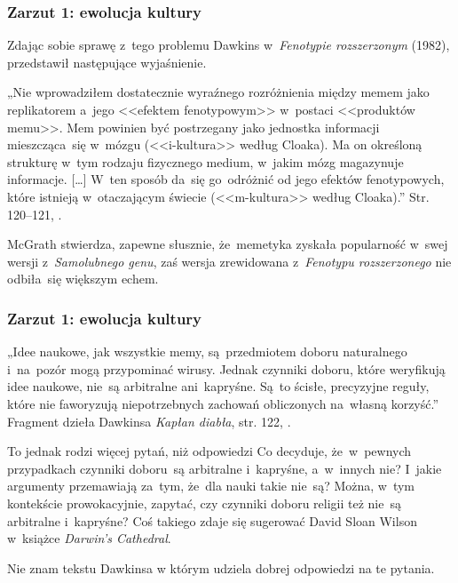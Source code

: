 \documentclass[10pt,t]{beamer}
\begin{document}
\begin{frame}
  \frametitle{Zarzut 1: ewolucja kultury}


  Zdając sobie sprawę z~tego problemu Dawkins w~\textit{Fenotypie
    rozszerzonym} (1982), przedstawił
  następujące wyjaśnienie.

  „Nie wprowadziłem dostatecznie wyraźnego rozróżnienia między memem
  jako replikatorem a~jego <<efektem fenotypowym>> w~postaci
  <<produktów memu>>. Mem powinien być postrzegany jako jednostka
  informacji mieszcząca~się w~mózgu (<<i-kultura>> według Cloaka).
  Ma on określoną strukturę w~tym rodzaju fizycznego medium, w~jakim
  mózg magazynuje informacje. [\ldots] W~ten sposób da~się go~odróżnić od
  jego efektów fenotypowych, które istnieją w~otaczającym świecie
  (<<m-kultura>> według Cloaka).” Str. 120--121,
  \cite{McGrathBogDawkinsa2008}.

  McGrath stwierdza, zapewne słusznie, że~memetyka
  zyskała popularność w~swej wersji z~\textit{Samolubnego genu}, zaś
  wersja zrewidowana z~\textit{Fenotypu rozszerzonego} nie odbiła~się
  większym echem.

\end{frame}





\begin{frame}
  \frametitle{Zarzut 1: ewolucja kultury}


  „Idee naukowe, jak wszystkie memy, są~przedmiotem doboru naturalnego
  i~na~pozór mogą przypominać wirusy. Jednak czynniki doboru, które
  weryfikują idee naukowe, nie~są arbitralne ani~kapryśne. Są~to ścisłe,
  precyzyjne reguły, które nie faworyzują niepotrzebnych zachowań
  obliczonych na~własną korzyść.” Fragment dzieła Dawkinsa
  \textit{Kapłan diabła}, str. 122, \cite{McGrathBogDawkinsa2008}.

  To jednak rodzi więcej pytań, niż odpowiedzi Co decyduje, że~w~pewnych
  przypadkach czynniki doboru~są
  arbitralne i~kapryśne, a~w~innych nie? I~jakie argumenty
  przemawiają za~tym, że~dla nauki takie nie~są? Można, w~tym
  kontekście prowokacyjnie, zapytać, czy czynniki doboru religii też
  nie~są arbitralne i~kapryśne? Coś takiego zdaje się sugerować David Sloan
  Wilson w~książce \textit{Darwin's Cathedral}.

  Nie znam tekstu Dawkinsa w którym udziela dobrej odpowiedzi na te pytania.

\end{frame}
\end{document}
